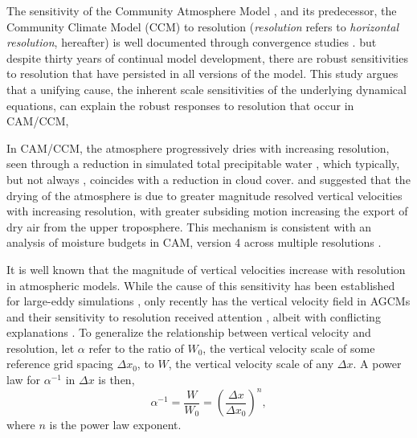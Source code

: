\documentclass[times]{qjrms4}
\begin{document}
The sensitivity of the Community Atmosphere Model \citep[CAM;][]{CAM5}, and its predecessor, the Community Climate Model (CCM) to resolution ({\em{resolution}} refers to {\em{horizontal resolution}}, hereafter) is well documented through convergence studies \citep{KW1991JGR,WETAL1995CD,W2008TELLUS,RETAL2013JCLIM,ZetAl2014JCb,HR2017JCLIM}. {\color{red}{CAM/CCM is a well supported climate model,}} but despite thirty years of continual model development, there are robust sensitivities to resolution that have persisted in all versions of the model. This study argues that a unifying cause, the inherent scale sensitivities of the underlying dynamical equations, can explain the robust responses to resolution that occur in CAM/CCM, {\color{red}{since it is difficult to conceive that inevitable responses to native grid resolution could be ignored in the pursuit of scale-aware physics.}}

In CAM/CCM, the atmosphere progressively dries with increasing resolution, seen through a reduction in simulated total precipitable water \citep{KW1991JGR,WETAL1995CD,W2008TELLUS,RETAL2013JCLIM,ZetAl2014JCb,HR2017JCLIM}, which typically, but not always \citep[see][]{WETAL1995CD,ZetAl2014JCb}, coincides with a reduction in cloud cover. \cite{KW1991JGR} and \cite{WETAL1995CD} suggested that the drying of the atmosphere is due to greater magnitude resolved vertical velocities with increasing resolution, with greater subsiding motion increasing the export of dry air from the upper troposphere. This mechanism is consistent with an analysis of moisture budgets in CAM, version 4 \citep[CAM4;][]{CAM4} across multiple resolutions \citep{YETAL2014JCLIM,HR2017JCLIM}.

It is well known that the magnitude of vertical velocities increase with resolution in atmospheric models. While the cause of this sensitivity has been established for large-eddy simulations \citep[see][and references therein]{J2017JAMES}, only recently has the vertical velocity field in AGCMs and their sensitivity to resolution received attention \citep{DETALA2016ACP,OETAL2016JAMES}, albeit with conflicting explanations \citep{RETAL2016CD,HR2018JAMES}. To generalize the relationship between vertical velocity and resolution, let $\alpha$ refer to the ratio of $W_0$, the vertical velocity scale of some reference grid spacing $\Delta x_0$, to $W$, the vertical velocity scale of any $\Delta x$. A power law for $\alpha^{-1}$ in $\Delta x$ is then,
\begin{equation}
\alpha^{-1} = \frac{W}{W_0} = \left( \frac{\Delta x}{\Delta x_0} \right)^n, \label{eq:alpha}
\end{equation}
where $n$ is the power law exponent. 
\end{document}
